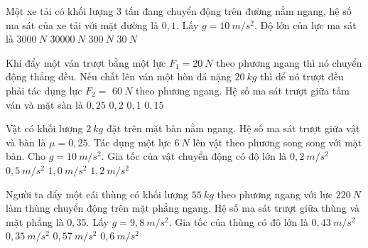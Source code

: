 \begin{ex}%
Một xe tải có khối lượng $3$ tấn đang chuyển động trên đường nằm ngang, hệ số ma sát của xe tải với mặt đường là $0,1$. Lấy $g=10\ m/s^2$. Độ lớn của lực ma sát là
\choice
{\True $3000\ N$}
{$30000\ N$}
{$300\ N$}
{$30\ N$}
 \end{ex}
\begin{ex}%
Khi đẩy một ván trượt bằng một lực $F_1=20\ N$ theo phương ngang thì nó chuyển động thẳng đều. Nếu chất lên ván một hòn đá nặng $20\ kg$ thì để nó trượt đều phải tác dụng lực $F_2=$ $60\ N$ theo phương ngang. Hệ số ma sát trượt giữa tấm ván và mặt sàn là
\choice
{$0,25$}
{\True $0,2$}
{$0,1$}
{$0,15$}
 \end{ex}
\begin{ex}%
Vật có khối lượng $2\ kg$ đặt trên mặt bàn nằm ngang. Hệ số ma sát trượt giữa vật và bàn là $\mu = 0,25$. Tác dụng một lực $6\ N$ lên vật theo phương song song với mặt bàn. Cho $g = 10\ m/s^2$. Gia tốc của vật chuyển động có độ lớn là
\choice
{$0,2\ m/s^2$}
{\True $0,5\ m/s^2$}
{$1,0\ m/s^2$}
{$1,2\ m/s^2$}
 \end{ex}
\begin{ex}%
Người ta đẩy một cái thùng có khối lượng $55\ kg$ theo phương ngang với lực $220\ N$ làm thùng chuyển động trên mặt phẳng ngang. Hệ số ma sát trượt giữa thùng và mặt phẳng là $0,35$. Lấy $g = 9,8\ m/s^2$. Gia tốc của thùng có độ lớn là
\choice
{$0,43\ m/s^2$}
{$0,35\ m/s^2$}
{\True $0,57\ m/s^2$}
{$0,6\ m/s^2$}
 \end{ex}
